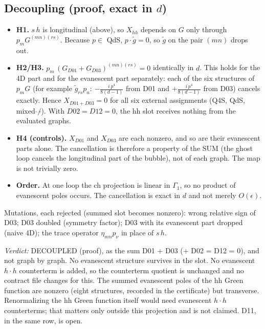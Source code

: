 \subsection{Decoupling (proof, exact in $d$)}
\begin{itemize}
\item \textbf{H1.} $s\,h$ is longitudinal (above), so $X_{hh}$ depends on $G$ only through $p_mG^{(mn)(rs)}$. Because
$p\in$ QdS, $p\cdot\tilde g=0$, so $\tilde g$ on the pair $(mn)$ drops out.
\item \textbf{H2/H3.} $p_m\,(G_{D01}+G_{D03})^{(mn)(rs)}=0$ identically in $d$. This holds for the 4D part and for
the evanescent part separately: each of the six structures of $p_mG$ (for example
$\tilde g_{rs}p_n$: $-\tfrac{i\,p^4}{8(d-1)}$ from D01 and $+\tfrac{i\,p^4}{8(d-1)}$ from D03) cancels exactly. Hence
$X_{D01+D03}=0$ for all six external assignments (Q4S, QdS, mixed $\hat{}/\tilde{}$). With $D02=D12=0$, the hh slot
receives nothing from the evaluated graphs.
\item \textbf{H4 (controls).} $X_{D01}$ and $X_{D03}$ are each nonzero, and so are their evanescent parts alone. The
cancellation is therefore a property of the SUM (the ghost loop cancels the longitudinal part of the bubble), not of
each graph. The map is not trivially zero.
\item \textbf{Order.} At one loop the ch projection is linear in $\Gamma_1$, so no product of evanescent poles occurs.
The cancellation is exact in $d$ and not merely $O(\epsilon)$.
\end{itemize}
Mutations, each rejected (summed slot becomes nonzero): wrong relative sign of D03; D03 doubled (symmetry factor);
D03 with its evanescent part dropped (naive 4D); the trace operator $\eta_{mn}p_\nu$ in place of $s\,h$.

\emph{Verdict:} DECOUPLED (proof), as the sum D01 + D03 (+ D02 = D12 = 0), and not graph by graph. No evanescent
structure survives in the slot. No evanescent $h\cdot h$ counterterm is added, so the counterterm quotient is
unchanged and no contract file changes for this. The summed evanescent poles of the hh Green function are nonzero
(eight structures, recorded in the certificate) but transverse. Renormalizing the hh Green function itself would
need evanescent $h\cdot h$ counterterms; that matters only outside this projection and is not claimed. D11, in the
same row, is open.


